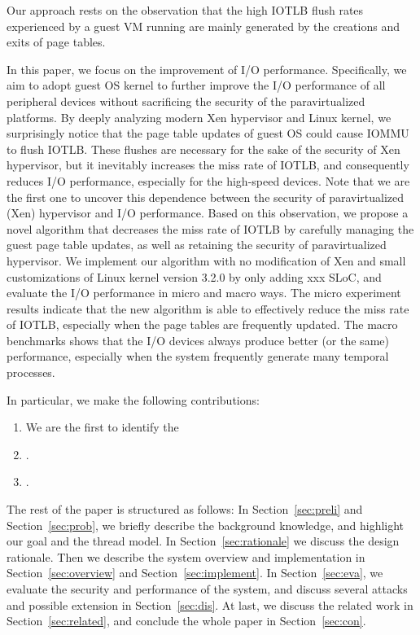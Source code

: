 Our approach rests on the observation that the high IOTLB flush rates experienced by a guest VM running 
are mainly generated by the creations and exits of page tables. 

In this paper, we focus on the improvement of I/O performance. Specifically, we aim to adopt guest OS kernel to further improve the I/O performance of all peripheral devices without sacrificing the security of the paravirtualized platforms. By deeply analyzing modern Xen hypervisor and Linux kernel, we surprisingly notice that the page table updates of guest OS could cause IOMMU to flush IOTLB. These flushes are necessary for the sake of the security of Xen hypervisor, but it inevitably increases the miss rate of IOTLB, and consequently reduces I/O performance, especially for the high-speed devices. Note that we are the first one to uncover this dependence between the security of paravirtualized (Xen) hypervisor and I/O performance. Based on this observation, we propose a novel algorithm that decreases the miss rate of IOTLB by carefully managing the guest page table updates, as well as retaining the security of paravirtualized hypervisor.
We implement our algorithm with no modification of Xen and small customizations of Linux kernel version 3.2.0 by only adding xxx SLoC, and evaluate the I/O performance in micro and macro ways. The micro experiment results indicate that the new algorithm is able to effectively reduce the miss rate of IOTLB, especially when the page tables are frequently updated. The macro benchmarks shows that the I/O devices always produce better (or the same) performance, especially when the system frequently generate many temporal processes.


In particular, we make the following contributions:
\begin{enumerate}
\item We are the first to identify the  
\item .
\item .
\end{enumerate}

The rest of the paper is structured as follows: In Section~\ref{sec:preli} and Section~\ref{sec:prob}, we briefly describe the background knowledge, and highlight our goal and the thread model. In Section~\ref{sec:rationale} we discuss the design rationale. Then we describe the system overview and implementation in Section~\ref{sec:overview} and Section~\ref{sec:implement}. In Section~\ref{sec:eva}, we evaluate the security and performance of the system, and discuss several attacks and possible extension in Section~\ref{sec:dis}. At last, we discuss the related work in Section~\ref{sec:related}, and conclude the whole paper in Section~\ref{sec:con}. 

